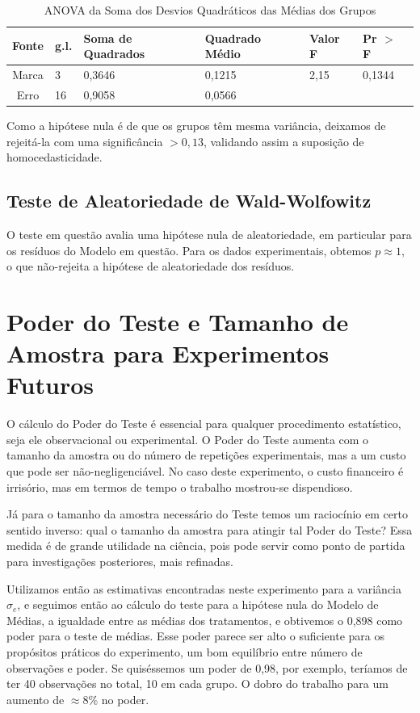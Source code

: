 \documentclass[a4paper,12pt,notitlepage]{article}
\begin{document}
    \begin{table}[!htb]
        \centering
        \begin{tabular}{c||p{17mm}|p{17mm}|p{17mm}|p{17mm}|p{17mm}}
         Fonte&g.l.&Soma de Quadrados&Quadrado Médio&Valor F&Pr $>$ F  \\\hline\hline
             Marca & 3 & 0,3646 & 0,1215 & 2,15 &  0,1344\\
             Erro & 16 &0,9058 & 0,0566
        \end{tabular}
        \caption{ANOVA da Soma dos Desvios Quadráticos das Médias dos Grupos}
        \label{tabela:levene}
    \end{table}
    
    Como a hipótese nula é de que os grupos têm mesma variância, deixamos de rejeitá-la com uma significância $>0,13$, validando assim a suposição de homocedasticidade.
    
    
\subsection{Teste de Aleatoriedade de Wald-Wolfowitz}
    O teste em questão avalia uma hipótese nula de aleatoriedade, em particular para os resíduos do Modelo em questão. Para os dados experimentais, obtemos $p \approx 1$, o que não-rejeita a hipótese de aleatoriedade dos resíduos.

\section{Poder do Teste e Tamanho de Amostra para Experimentos Futuros}
    O cálculo do Poder do Teste é essencial para qualquer procedimento estatístico, seja ele observacional ou experimental. O Poder do Teste aumenta com o tamanho da amostra ou do número de repetições experimentais, mas a um custo que pode ser não-negligenciável. No caso deste experimento, o custo financeiro é irrisório, mas em termos de tempo o trabalho mostrou-se dispendioso. 
    
    Já para o tamanho da amostra necessário do Teste temos um raciocínio em certo sentido inverso: qual o tamanho da amostra para atingir tal Poder do Teste? Essa medida é de grande utilidade na ciência, pois pode servir como ponto de partida para investigações posteriores, mais refinadas. 
    
    Utilizamos então as estimativas encontradas neste experimento para a variância $\sigma_e$, e seguimos então ao cálculo do teste para a hipótese nula do Modelo de Médias, a igualdade entre as médias dos tratamentos, e obtivemos o 0,898 como poder para o teste de médias. Esse poder parece ser alto o suficiente para os propósitos práticos do experimento, um bom equilíbrio entre número de observações e poder. Se quiséssemos um poder de 0,98, por exemplo, teríamos de ter 40 observações no total, 10 em cada grupo. O dobro do trabalho para um aumento de $\approx 8\%$ no poder.
\end{document}
